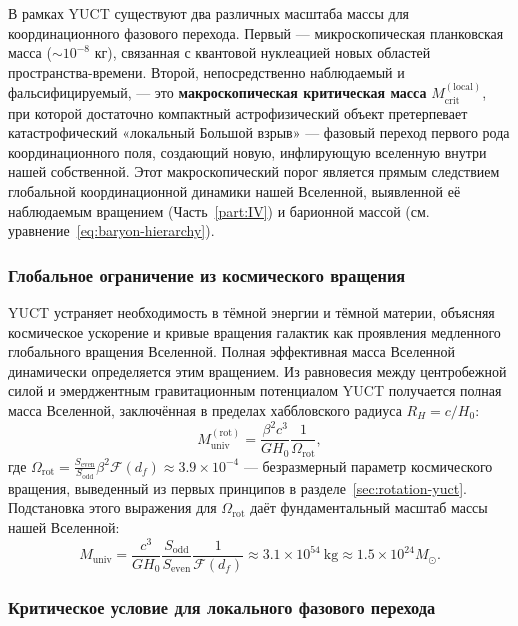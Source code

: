 \documentclass[11pt,a4paper]{article}
\begin{document}
	В рамках YUCT существуют два различных масштаба массы для координационного фазового перехода. Первый — микроскопическая планковская масса (\(\sim 10^{-8}\) кг), связанная с квантовой нуклеацией новых областей пространства-времени. Второй, непосредственно наблюдаемый и фальсифицируемый, — это \textbf{макроскопическая критическая масса} \(M_{\mathrm{crit}}^{\mathrm{(local)}}\), при которой достаточно компактный астрофизический объект претерпевает катастрофический «локальный Большой взрыв» — фазовый переход первого рода координационного поля, создающий новую, инфлирующую вселенную внутри нашей собственной. Этот макроскопический порог является прямым следствием глобальной координационной динамики нашей Вселенной, выявленной её наблюдаемым вращением (Часть~\ref{part:IV}) и барионной массой (см. уравнение~\ref{eq:baryon-hierarchy}).
	
	\subsubsection{Глобальное ограничение из космического вращения}
	
	YUCT устраняет необходимость в тёмной энергии и тёмной материи, объясняя космическое ускорение и кривые вращения галактик как проявления медленного глобального вращения Вселенной. Полная эффективная масса Вселенной динамически определяется этим вращением. Из равновесия между центробежной силой и эмерджентным гравитационным потенциалом YUCT получается полная масса Вселенной, заключённая в пределах хаббловского радиуса \(R_H = c/H_0\):
	\begin{equation}
		M_{\mathrm{univ}}^{\mathrm{(rot)}} = \frac{\beta^2 c^3}{G H_0} \frac{1}{\Omega_{\mathrm{rot}}},
	\end{equation}
	где \(\Omega_{\mathrm{rot}} = \frac{S_{\mathrm{even}}}{S_{\mathrm{odd}}} \beta^2 \mathcal{F}(d_f) \approx 3.9 \times 10^{-4}\) — безразмерный параметр космического вращения, выведенный из первых принципов в разделе~\ref{sec:rotation-yuct}. Подстановка этого выражения для \(\Omega_{\mathrm{rot}}\) даёт фундаментальный масштаб массы нашей Вселенной:
	\begin{equation}
		M_{\mathrm{univ}} = \frac{c^3}{G H_0} \frac{S_{\mathrm{odd}}}{S_{\mathrm{even}}} \frac{1}{\mathcal{F}(d_f)} \approx 3.1 \times 10^{54}\ \mathrm{kg} \approx 1.5 \times 10^{24} M_{\odot}.
	\end{equation}
	
	\subsubsection{Критическое условие для локального фазового перехода}
	
\end{document}
